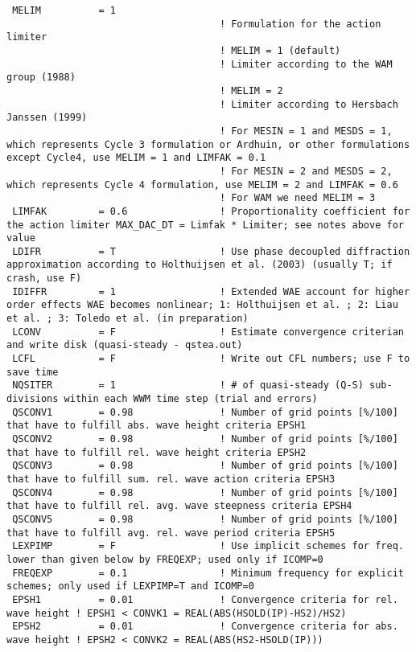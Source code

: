 \documentclass[12pt]{amsart}
\begin{document}
\begin{verbatim}
 MELIM          = 1
                                     ! Formulation for the action limiter
                                     ! MELIM = 1 (default)
                                     ! Limiter according to the WAM group (1988)
                                     ! MELIM = 2
                                     ! Limiter according to Hersbach Janssen (1999)
                                     ! For MESIN = 1 and MESDS = 1, which represents Cycle 3 formulation or Ardhuin, or other formulations except Cycle4, use MELIM = 1 and LIMFAK = 0.1
                                     ! For MESIN = 2 and MESDS = 2, which represents Cycle 4 formulation, use MELIM = 2 and LIMFAK = 0.6
                                     ! For WAM we need MELIM = 3
 LIMFAK         = 0.6                ! Proportionality coefficient for the action limiter MAX_DAC_DT = Limfak * Limiter; see notes above for value
 LDIFR          = T                  ! Use phase decoupled diffraction approximation according to Holthuijsen et al. (2003) (usually T; if crash, use F)
 IDIFFR         = 1                  ! Extended WAE account for higher order effects WAE becomes nonlinear; 1: Holthuijsen et al. ; 2: Liau et al. ; 3: Toledo et al. (in preparation)
 LCONV          = F                  ! Estimate convergence criterian and write disk (quasi-steady - qstea.out)
 LCFL           = F                  ! Write out CFL numbers; use F to save time
 NQSITER        = 1                  ! # of quasi-steady (Q-S) sub-divisions within each WWM time step (trial and errors)
 QSCONV1        = 0.98               ! Number of grid points [%/100] that have to fulfill abs. wave height criteria EPSH1
 QSCONV2        = 0.98               ! Number of grid points [%/100] that have to fulfill rel. wave height criteria EPSH2
 QSCONV3        = 0.98               ! Number of grid points [%/100] that have to fulfill sum. rel. wave action criteria EPSH3
 QSCONV4        = 0.98               ! Number of grid points [%/100] that have to fulfill rel. avg. wave steepness criteria EPSH4
 QSCONV5        = 0.98               ! Number of grid points [%/100] that have to fulfill avg. rel. wave period criteria EPSH5
 LEXPIMP        = F                  ! Use implicit schemes for freq. lower than given below by FREQEXP; used only if ICOMP=0
 FREQEXP        = 0.1                ! Minimum frequency for explicit schemes; only used if LEXPIMP=T and ICOMP=0
 EPSH1          = 0.01               ! Convergence criteria for rel. wave height ! EPSH1 < CONVK1 = REAL(ABS(HSOLD(IP)-HS2)/HS2)
 EPSH2          = 0.01               ! Convergence criteria for abs. wave height ! EPSH2 < CONVK2 = REAL(ABS(HS2-HSOLD(IP)))

\end{verbatim}
\end{document}
